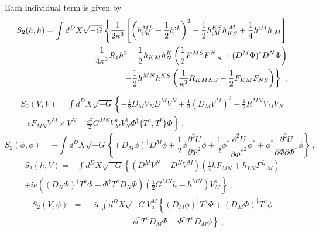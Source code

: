 \documentclass[a4paper,12pt]{article}
\begin{document}
Each individual term is given by
\begin{eqnarray}
S_2(h,h)=\int d^D X \sqrt{-G}\left\{\frac{1}{2\kappa^2}
\left[\left(h^{ML}_{;M}
-\frac{1}{2}h^{;L}\right)^2
-\frac{1}{2}h^{KS}_{;M}h_{KS}^{;M} + \frac{1}{4}h^{;M}h_{;M}\right]
\right.\\
- \frac{1}{4\kappa^2}R_1 h^2
\nonumber
\label{h}
 - \frac{1}{2}h_{KM}h^K _N \left(\frac{1}{2}F^{MS}F^N_{\quad S} +
(D^M\Phi)^{\dagger}D^N\Phi\right)\\
\nonumber
\left.\hspace{1.5cm}-\frac{1}{2}h^{MN}h^{KS}
\left(\frac{1}{\kappa^2}R _{KMNS}-
\frac{1}{2}F_{KM}F_{NS}\right)\right\}~,
\end{eqnarray}
\begin{eqnarray}
S_2(V,V)= \int d^D X \sqrt{-G}\left\{-\frac{1}{2}D_M V_N D^M V^N
+\frac{1}{2} (D_M V^M)^2 - \frac{1}{2}R^{MN}V_M V_N\right.\\
\left.- e F_{MN}V^M\times V^N \nonumber  -
\frac{e^2}{2}G^{MN} V^a _M
V^b _N \Phi^{\dagger}\{T^a, T^b\}\Phi \right\} ~,
\label{v}
\end{eqnarray}
\begin{equation}
S_2(\phi,\phi)=-\int d^D X \sqrt{-G}
\left\{(D_M\phi)^{\dagger} D^M \phi
+\frac{1}{2}\phi \frac{\partial^2 U}{\partial \Phi^2}\phi
+\frac{1}{2}\phi^* \frac{\partial^2 U}{\partial {\Phi^*}^2}\phi^*
+\phi^*
\frac{\partial^2 U}{\partial \Phi\partial \Phi^*}\phi\right\}~,
\label{scal2}
\end{equation}
\begin{eqnarray}
S_2(h,V)= -\int d^D X \sqrt{-G}\left\{\left(D^M V^N - D^N V^M\right)
\left(\frac{1}{4}h F_{MN} + h_{LN} F^L_{\quad M}\right)\right.\\
\nonumber
\left. +ie((D_N\Phi)^{ \dagger}T^a\Phi -\Phi^{\dagger}T^a
D_N\Phi)\left(\frac{1}{2}G^{MN} h -h^{MN}\right)V^a_M\right\}~,
 \label{h,v}
\end{eqnarray}
\begin{eqnarray}
S_2(V,\phi)&=& -ie\int d^D X \sqrt{-G}V^M _a
\left\{(D_M\phi)^{\dagger} T^a
\Phi +(D_M\Phi)^{\dagger} T^a\phi\right.\\
\nonumber
& & \hspace{2cm}\left. -\phi^{\dagger}T^a D_M\Phi
-\Phi^{\dagger}T^a D_M\phi\right\}~,
 \label{phi,v}
\end{eqnarray}
\end{document}
